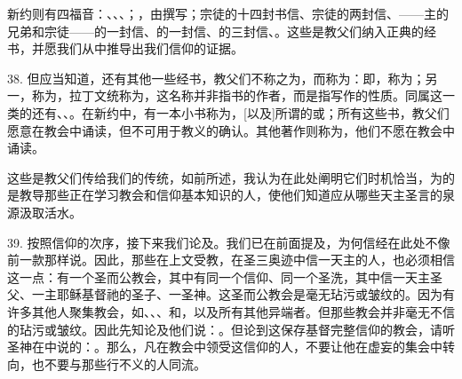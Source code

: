 新约则有四福音：、、、；，由撰写；宗徒的十四封书信、宗徒的两封信、——主的兄弟和宗徒——的一封信、的一封信、的三封信、。这些是教父们纳入正典的经书，并愿我们从中推导出我们信仰的证据。\par

38. 但应当知道，还有其他一些经书，教父们不称之为，而称为：即，称为；另一，称为，拉丁文统称为，这名称并非指书的作者，而是指写作的性质。同属这一类的还有、、。在新约中，有一本小书称为，[以及]所谓的或；所有这些书，教父们愿意在教会中诵读，但不可用于教义的确认。其他著作则称为，他们不愿在教会中诵读。\par

这些是教父们传给我们的传统，如前所述，我认为在此处阐明它们时机恰当，为的是教导那些正在学习教会和信仰基本知识的人，使他们知道应从哪些天主圣言的泉源汲取活水。\par

39. 按照信仰的次序，接下来我们论及。我们已在前面提及，为何信经在此处不像前一款那样说。因此，那些在上文受教，在圣三奥迹中信一天主的人，也必须相信这一点：有一个圣而公教会，其中有同一个信仰、同一个圣洗，其中信一天主圣父、一主耶稣基督祂的圣子、一圣神。这圣而公教会是毫无玷污或皱纹的。因为有许多其他人聚集教会，如、、、和，以及所有其他异端者。但那些教会并非毫无不信的玷污或皱纹。因此先知论及他们说：。但论到这保存基督完整信仰的教会，请听圣神在中说的：。那么，凡在教会中领受这信仰的人，不要让他在虚妄的集会中转向，也不要与那些行不义的人同流。\par

